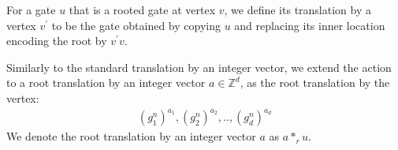 \begin{definition} 
  For a gate $u$ that is a rooted gate at vertex $v$, we define its translation by a vertex $v^{\prime}$ to be the gate obtained by copying $u$ and replacing its inner location encoding the root by $v^{\prime}v$. 

Similarly to the standard translation by an integer vector, we extend the action to a root translation by an integer vector $a \in \mathbb{Z}^{d}$, as the root translation by the vertex:
   \begin{equation*}
     \begin{split}
       (g_{1}^{n})^{a_{1}}, (g_{2}^{n})^{a_{2}},.., (g_{d}^{n})^{a_{d}}
     \end{split}
   \end{equation*}
   We denote the root translation by an integer vector $a$ as $a *_{r} u$.
\end{definition}

